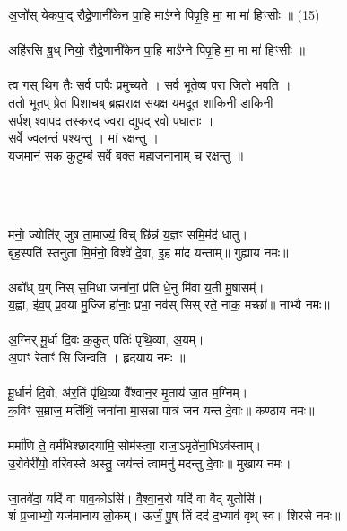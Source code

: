 अ॒जो᳚स् येकपा॒द् रौद्रे॒णानी॑केन पा॒हि माऽ᳚ग्ने पिपृ॒हि मा॒ मा मा॑ हिꣳसीः ॥ (15)\\
\\
अहि॑रसि बु॒ध् नियो॒ रौद्रे॒णानी॑केन पा॒हि माऽ᳚ग्ने पिपृ॒हि मा॒ मा मा॑ हिꣳसीः ॥\\
\\
त्व गस् थिग तैः सर्व पापैः प्रमुच्यते । सर्व भूतेष्व परा जितो भवति ।\\
ततो भूतप् प्रेत पिशाचब् ब्रह्मराक्ष सयक्ष यमदूत शाकिनी डाकिनी \\
सर्पश् श्वापद तस्करद् ज्वरा द्युपद् रवो पघाताः । \\
सर्वे ज्वलन्तं पश्यन्तु । मां रक्षन्तु ।\\
यजमानं  सक कुटुम्बं सर्वे बक्त महाजनानाम्  च  रक्षन्तु ॥\\
\\
\subsection{}
\\
मनो॒ ज्योति॑र् जुष ता॒माज्यं॒ विच् छि॑न्नं य॒ज्ञꣳ समि॒मंद॑ धातु। \\
बृह॒स्पति॑ स्तनुता मि॒मंनो॒ विश्वे॑ दे॒वा, इ॒ह मा॑द यन्ताम्॥ गुह्याय नमः॥\\
\\
अबो᳚ध् य॒ग् निस् स॒मिधा जना॑नां॒ प्र॑ति धे॒नु मि॑वा य॒ती मु॒षासम्᳚। \\
य॒ह्वा, इ॑व॒प् प्र॒वया मु॒ज्जि हा॑नाः॒ प्रभा॒ नव॑स् सिस् रते॒ नाक॒ मच्छा॑॥ नाभ्यै नमः॥\\
\\
अ॒ग्निर् मू॒र्धा दि॒वः क॒कुत् पतिः॑ पृथि॒व्या, अ॒यम्। \\
अ॒पाꣳ रेताꣳ॑ सि जिन्वति । हृदयाय नमः ॥\\
\\
मू॒र्धानं॑ दि॒वो, अ॑र॒तिं पृ॑थि॒व्या वै᳚श्वान॒र मृ॒ताय॑ जा॒त म॒ग्निम्‌। \\
क॒विꣳ स॒म्राज॒ मति॑थिं॒ जना॑ना मा॒सन्ना पात्रं॑ जन यन्त दे॒वाः॥ कण्ठाय नमः॥ \\
\\
मर्मा॑णि ते॒ वर्म॑भिश्छादयामि॒ सोम॑स्त्वा॒ राजा॒ऽमृते॑ना॒भिऽव॑स्ताम्।\\
उ॒रोर्वरी॑यो॒ वरि॑वस्ते अस्तु॒ जय॑न्तं त्वामनु॑ मदन्तु दे॒वाः॥ मुखाय नमः।\\
\\
जा॒तवे॑दा॒ यदि॑ वा पाव॒कोऽसि॑। वै॒श्वा॒न॒रो यदि॑ वा वैद् युतोसि॑। \\
शं प्र॒जाभ्यो॒ यज॑मानाय लो॒कम्। ऊर्जं॒ पु॒ष् तिं दद॑ द॒भ्याव॑ वृथ् स्व॥ शिरसे नमः॥\\
\\
